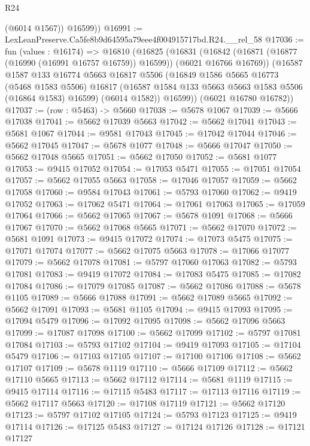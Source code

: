 \begin{lexlean}{R24}
\begin{coremodule}
          (@6014 @1567))
        @16599))
@16991 := LexLeanPreserve.Ca5fe8b9d64595a79eee4f004915717bd.R24.__rel_58
@17036 := fun (values : @16174) =>
  @16810
    (@16825
      (@16831
        (@16842 (@16871 (@16877 (@16990 (@16991 @16757 @16759)) @16599)) (@6021 @16766 @16769))
        (@16587
          @1587
          @133
          @16774
          @5663
          @16817
          @5506
          (@16849
            @1586
            @5665
            @16773
            (@5468 @1583 @5506)
            @16817
            (@16587 @1584 @133 @5663 @5663 @1583 @5506 (@16864 @1583) @16599)
            (@6014 @1582))
          @16599))
      (@6021 @16780 @16782))
@17037 := (row : @5463) -> @5660
@17038 := @5678 @1067
@17039 := @5666 @17038
@17041 := @5662 @17039 @5663
@17042 := @5662 @17041
@17043 := @5681 @1067
@17044 := @9581 @17043
@17045 := @17042 @17044
@17046 := @5662 @17045
@17047 := @5678 @1077
@17048 := @5666 @17047
@17050 := @5662 @17048 @5665
@17051 := @5662 @17050
@17052 := @5681 @1077
@17053 := @9415 @17052
@17054 := @17053 @5471
@17055 := @17051 @17054
@17057 := @5662 @17055 @5663
@17058 := @17046 @17057
@17059 := @5662 @17058
@17060 := @9584 @17043
@17061 := @5793 @17060
@17062 := @9419 @17052
@17063 := @17062 @5471
@17064 := @17061 @17063
@17065 := @17059 @17064
@17066 := @5662 @17065
@17067 := @5678 @1091
@17068 := @5666 @17067
@17070 := @5662 @17068 @5665
@17071 := @5662 @17070
@17072 := @5681 @1091
@17073 := @9415 @17072
@17074 := @17073 @5475
@17075 := @17071 @17074
@17077 := @5662 @17075 @5663
@17078 := @17066 @17077
@17079 := @5662 @17078
@17081 := @5797 @17060 @17063
@17082 := @5793 @17081
@17083 := @9419 @17072
@17084 := @17083 @5475
@17085 := @17082 @17084
@17086 := @17079 @17085
@17087 := @5662 @17086
@17088 := @5678 @1105
@17089 := @5666 @17088
@17091 := @5662 @17089 @5665
@17092 := @5662 @17091
@17093 := @5681 @1105
@17094 := @9415 @17093
@17095 := @17094 @5479
@17096 := @17092 @17095
@17098 := @5662 @17096 @5663
@17099 := @17087 @17098
@17100 := @5662 @17099
@17102 := @5797 @17081 @17084
@17103 := @5793 @17102
@17104 := @9419 @17093
@17105 := @17104 @5479
@17106 := @17103 @17105
@17107 := @17100 @17106
@17108 := @5662 @17107
@17109 := @5678 @1119
@17110 := @5666 @17109
@17112 := @5662 @17110 @5665
@17113 := @5662 @17112
@17114 := @5681 @1119
@17115 := @9415 @17114
@17116 := @17115 @5483
@17117 := @17113 @17116
@17119 := @5662 @17117 @5663
@17120 := @17108 @17119
@17121 := @5662 @17120
@17123 := @5797 @17102 @17105
@17124 := @5793 @17123
@17125 := @9419 @17114
@17126 := @17125 @5483
@17127 := @17124 @17126
@17128 := @17121 @17127

\end{coremodule}
\end{lexlean}
